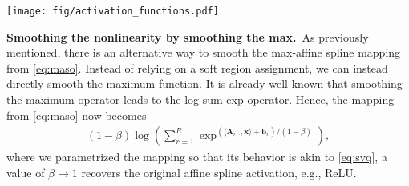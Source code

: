


\begin{figure*}[t]
\vskip 0.1in
\begin{center}
\centerline{\texttt{[image: fig/activation\_functions.pdf]}}
\caption{\small Visualization of nonlinearity smoothing through region assignment smoothing, max smoothing, and their combination. \textbf{The combined approach mitigates the opposing biases introduced by the individual methods.}}
\label{fig:examples}
\end{center}
\vskip -0.1in
\end{figure*}

{\bf Smoothing the nonlinearity by smoothing the max.}~As previously mentioned, there is an alternative way to smooth the max-affine spline mapping from \cref{eq:maso}. Instead of relying on a soft region assignment, we can instead directly smooth the maximum function. It is already well known that smoothing the maximum operator leads to the log-sum-exp operator. Hence, the mapping from \cref{eq:maso} now becomes
\begin{align}
     (1-\beta)\log(\sum_{r=1}^{R}\exp^{(\langle \mathbf{A}_{r,\cdot}, \mathbf{x} \rangle + \mathbf{b}_r)/(1-\beta)}),\label{eq:lse}
\end{align}
where we parametrized the mapping so that its behavior is akin to \cref{eq:svq}, a value of $\beta \rightarrow 1$ recovers the original affine spline activation, e.g., ReLU.

